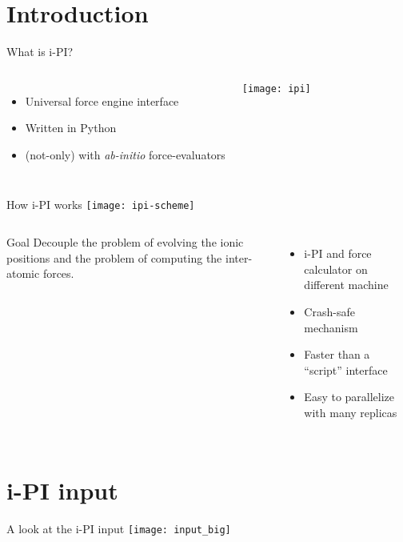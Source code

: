 \section{Introduction}
\begin{frame}{What is i-PI?}
 \begin{columns}
   \begin{itemize}
   \item Universal force engine interface
     \vspace{0.3cm}
   \item Written in Python
     \vspace{0.3cm}
   \item (not-only) with \emph{ab-initio}
     force-evaluators
   \end{itemize}
   \texttt{[image: ipi]}
 \end{columns}
\end{frame}

\begin{frame}{How i-PI works}
  \texttt{[image: ipi-scheme]}

  \begin{columns}
    \begin{block}{Goal}
      Decouple the problem of evolving the ionic positions and the
      problem of computing the inter-atomic forces.
    \end{block}
    \begin{itemize}
      \item i-PI and force calculator on different machine
      \item Crash-safe mechanism
      \item Faster than a ``script'' interface
      \item Easy to parallelize with many replicas
    \end{itemize}
  \end{columns}
\end{frame}

\section{i-PI input}

\begin{frame}{A look at the i-PI input}
\texttt{[image: input\_big]}
\end{frame}


